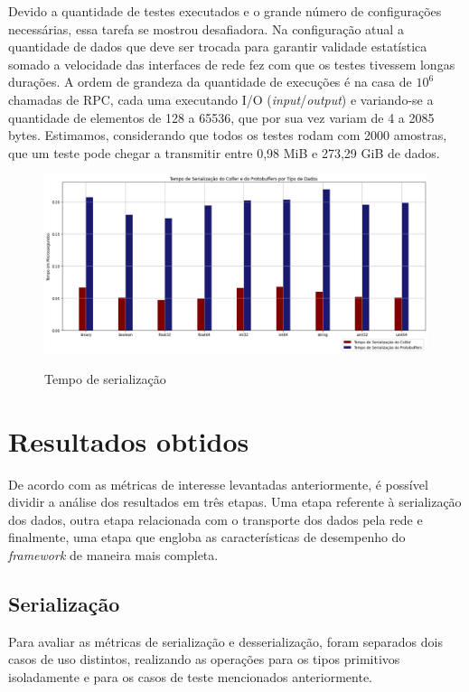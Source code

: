 Devido a quantidade de testes executados e o grande número de configurações necessárias, essa tarefa se mostrou desafiadora. Na configuração atual a quantidade de dados que deve ser trocada para garantir validade estatística somado a velocidade das interfaces de rede fez com que os testes tivessem longas durações. A ordem de grandeza da quantidade de execuções é na casa de $10^6$ chamadas de RPC, cada uma executando I/O (\textit{input}/\textit{output}) e variando-se a quantidade de elementos de 128 a 65536, que por sua vez variam de 4 a 2085 bytes. Estimamos, considerando que todos os testes rodam com 2000 amostras, que um teste pode chegar a transmitir entre 0,98 MiB e 273,29 GiB de dados.

\begin{figure}[ht]
    \centering
    \caption{Tempo de serialização}
    \includegraphics[width=\textwidth]{figuras/graficos/serializacao/tempo_serializacao.png} 
    \label{fig:tempo_serializacao}
\end{figure}

\section{Resultados obtidos}
\label{sec:resultados}

De acordo com as métricas de interesse levantadas anteriormente, é possível dividir a análise dos resultados em três etapas. Uma etapa referente à serialização dos dados, outra etapa relacionada com o transporte dos dados pela rede e finalmente, uma etapa que engloba as características de desempenho do \textit{framework} de maneira mais completa.

\subsection{Serialização}

Para avaliar as métricas de serialização e desserialização, foram separados dois casos de uso distintos, realizando as operações para os tipos primitivos isoladamente e para os casos de teste mencionados anteriormente.

